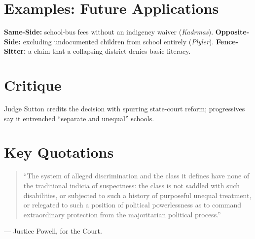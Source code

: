 \documentclass[12pt]{article}
\begin{document}
\section{Examples: Future Applications}
\textbf{Same-Side:} school-bus fees without an indigency waiver (\textit{Kadrmas}). \textbf{Opposite-Side:} excluding undocumented children from school entirely (\textit{Plyler}). \textbf{Fence-Sitter:} a claim that a collapsing district denies basic literacy.

\section{Critique}
Judge Sutton credits the decision with spurring state-court reform; progressives say it entrenched ``separate and unequal'' schools.

\section{Key Quotations}
\begin{quote}
``The system of alleged discrimination and the class it defines have none of the traditional indicia of suspectness: the class is not saddled with such disabilities, or subjected to such a history of purposeful unequal treatment, or relegated to such a position of political powerlessness as to command extraordinary protection from the majoritarian political process.''
\end{quote}
\noindent --- Justice Powell, for the Court.
\end{document}
